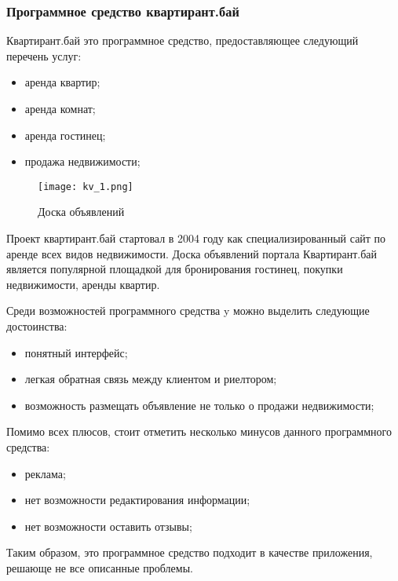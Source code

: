 \subsubsection{Программное средство квартирант.бай}

Квартирант.бай это программное средство, предоставляющее следующий перечень услуг:

\begin{itemize}
	\item аренда квартир;
	\item аренда комнат;
	\item аренда гостинец;
	\item продажа недвижимости;
\end{itemize}

\begin{figure}[!htb]
	\centering
	\texttt{[image: kv\_1.png]}
	\caption{ Доска объявлений }
	\label{fig:arch_and_mod::lexer_flow}
	\clearpage
\end{figure}

Проект квартирант.бай стартовал в 2004 году как специализированный сайт по аренде всех видов недвижимости. Доска объявлений портала Квартирант.бай является популярной площадкой для бронирования гостинец, покупки недвижимости, аренды квартир.

Среди возможностей программного средства y можно выделить следующие достоинства:

\begin{itemize}
	\item понятный интерфейс;
	\item легкая обратная связь между клиентом и риелтором;
	\item возможность размещать объявление не только о продажи недвижимости;
\end{itemize}

Помимо всех плюсов, стоит отметить несколько минусов данного программного средства:

\begin{itemize}
	\item реклама;
	\item нет возможности редактирования информации;
	\item нет возможности оставить отзывы;
\end{itemize}

Таким образом, это программное средство подходит в качестве приложения, решающе не все описанные проблемы.


